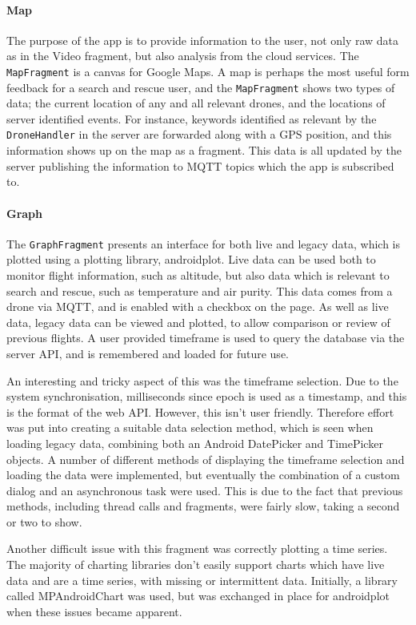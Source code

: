\documentclass{article}
\begin{document}
\paragraph{Map}
The purpose of the app is to provide information to the user, not only raw data as in the Video fragment, but also analysis from the cloud services. The \texttt{MapFragment} is a canvas for Google Maps. A map is perhaps the most useful form feedback for a search and rescue user, and the \texttt{MapFragment} shows two types of data; the current location of any and all relevant drones, and the locations of server identified events. For instance, keywords identified as relevant by the \texttt{DroneHandler} in the server are forwarded along with a GPS position, and this information shows up on the map as a fragment. This data is all updated by the server publishing the information to MQTT topics which the app is subscribed to.

\paragraph{Graph}
The \texttt{GraphFragment} presents an interface for both live and legacy data, which is plotted using a plotting library, androidplot. Live data can be used both to monitor flight information, such as altitude, but also data which is relevant to search and rescue, such as temperature and air purity. This data comes from a drone via MQTT, and is enabled with a checkbox on the page. As well as live data, legacy data can be viewed and plotted, to allow comparison or review of previous flights. A user provided timeframe is used to query the database via the server API, and is remembered and loaded for future use. 

An interesting and tricky aspect of this was the timeframe selection. Due to the system synchronisation, milliseconds since epoch is used as a timestamp, and this is the format of the web API. However, this isn't user friendly. Therefore effort was put into creating a suitable data selection method, which is seen when loading legacy data, combining both an Android DatePicker and TimePicker objects. A number of different methods of displaying the timeframe selection and loading the data were implemented, but eventually the combination of a custom dialog and an asynchronous task were used. This is due to the fact that previous methods, including thread calls and fragments, were fairly slow, taking a second or two to show. 

Another difficult issue with this fragment was correctly plotting a time series. The majority of charting libraries don't easily support charts which have live data and are a time series, with missing or intermittent data. Initially, a library called MPAndroidChart was used, but was exchanged in place for androidplot when these issues became apparent.   
\end{document}
